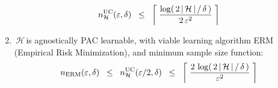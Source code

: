 \begin{theorem}
\begin{enumerate}
\begin{equation*}
	n^{\textnormal{UC}}_{\mathcal{H}}(\varepsilon,\delta)
	\;\; \leq \;\;
		\left\lceil\; \dfrac{\log\!\left(\,2\,\vert\,\mathcal{H}\,\vert\,/\,\delta\,\right)}{2\,\varepsilon^{2}} \;\right\rceil
	\end{equation*}
\item
	\,$\mathcal{H}$\,is agnostically PAC learnable,
	with viable learning algorithm ERM (Empirical Risk Minimization),
	and minimum sample size function:
	\begin{equation*}
	n_{\textnormal{ERM}}(\varepsilon,\delta)
	\;\; \leq \;\;
		n^{\textnormal{UC}}_{\mathcal{H}}(\varepsilon/2,\delta)
	\;\; \leq \;\;
		\left\lceil\; \dfrac{2\,\log\!\left(\,2\,\vert\,\mathcal{H}\,\vert\,/\,\delta\,\right)}{\varepsilon^{2}} \;\right\rceil
	\end{equation*}
\end{enumerate}
\end{theorem}
\proof
